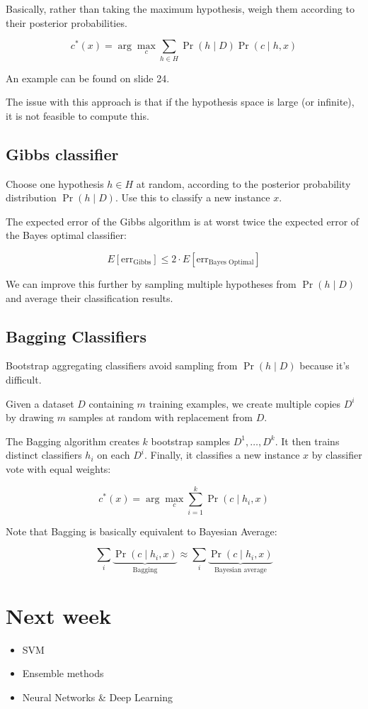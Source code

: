 \documentclass{idc_msc}
\begin{document}
Basically, rather than taking the maximum hypothesis, weigh them according to their posterior probabilities.

\[c^*(x) = \arg\max_c \sum_{h \in H} \Pr(h \mid D) \Pr(c \mid h, x)\]

An example can be found on slide 24.

The issue with this approach is that if the hypothesis space is large (or infinite), it is not feasible to compute this.

\subsection{Gibbs classifier}

Choose one hypothesis \(h \in H\) at random, according to the posterior probability distribution \(\Pr(h \mid D)\).
Use this to classify a new instance \(x\).

The expected error of the Gibbs algorithm is at worst twice the expected error of the Bayes optimal classifier:

\[E[\text{err}_{\text{Gibbs}}] \le 2 \cdot E[\text{err}_{\text{Bayes Optimal}}]\]

We can improve this further by sampling multiple hypotheses from \(\Pr(h \mid D)\) and average their classification results.

\subsection{Bagging Classifiers}

Bootstrap aggregating classifiers avoid sampling from \(\Pr(h \mid D)\) because it's difficult.

Given a dataset \(D\) containing \(m\) training examples, we create multiple copies \(D^i\) by drawing \(m\) samples at random with replacement from \(D\).

The Bagging algorithm creates \(k\) bootstrap samples \(D^1,\ldots,D^k\).
It then trains distinct classifiers \(h_i\) on each \(D^i\).
Finally, it classifies a new instance \(x\) by classifier vote with equal weights:

\[c^*(x) = \arg\max_c \sum_{i=1}^k \Pr(c \mid h_i, x)\]

Note that Bagging is basically equivalent to Bayesian Average:

\[\sum_i \underbrace{\Pr(c \mid h_i, x)}_{\text{Bagging}} \approx \sum_i \underbrace{\Pr(c \mid h_i, x)}_{\text{Bayesian average}}\]

\section{Next week}

\begin{itemize}
  \item SVM
  \item Ensemble methods
  \item Neural Networks \& Deep Learning
\end{itemize}
\end{document}

